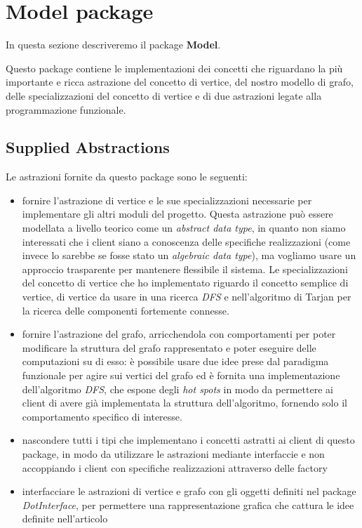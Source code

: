 \section{Model package}

In questa sezione descriveremo il package \textbf{Model}.

Questo package contiene le implementazioni dei concetti che riguardano
la pi\`u importante e ricca astrazione del concetto di vertice, del
nostro modello di grafo, delle specializzazioni del concetto di
vertice e di due astrazioni legate alla programmazione funzionale.

\subsection{Supplied Abstractions}
\label{subsection:model-supplied-abstractions}
Le astrazioni fornite da questo package sono le seguenti:
\begin{itemize}
\label{itemize:model-supplied-abstraction}
\item fornire l'astrazione di vertice e le sue specializzazioni
  necessarie per implementare gli altri moduli del progetto. Questa
  astrazione pu\`o essere modellata a livello teorico come un
  \emph{abstract data type}, in quanto non siamo interessati che i
  client siano a conoscenza delle specifiche realizzazioni (come
  invece lo sarebbe se fosse stato un \emph{algebraic data type}), ma
  vogliamo usare un approccio trasparente per mantenere flessibile il
  sistema. Le specializzazioni del concetto di vertice che ho
  implementato riguardo il concetto semplice di vertice, di vertice da
  usare in una ricerca \emph{DFS} e nell'algoritmo di Tarjan per la
  ricerca delle componenti fortemente connesse.
\item fornire l'astrazione del grafo, arricchendola con comportamenti
  per poter modificare la struttura del grafo rappresentato e poter
  eseguire delle computazioni su di esso: \`e possibile usare due idee
  prese dal paradigma funzionale per agire sui vertici del grafo ed
  \`e fornita una implementazione dell'algoritmo \emph{DFS}, che espone
  degli \emph{hot spots} in modo da permettere ai client di avere
  gi\`a implementata la struttura dell'algoritmo, fornendo solo il
  comportamento specifico di interesse.
\item nascondere tutti i tipi che implementano i concetti astratti ai
  client di questo package, in modo da utilizzare le astrazioni
  mediante interfaccie e non accoppiando i client con specifiche
  realizzazioni attraverso delle factory 
\item interfacciare le astrazioni di vertice e grafo con gli oggetti
  definiti nel package \emph{DotInterface}, per permettere una
  rappresentazione grafica che cattura le idee definite nell'articolo
  \cite{tellingStories}
\end{itemize}

